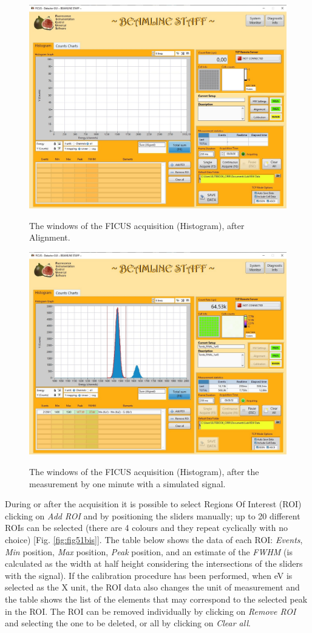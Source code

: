 \documentclass[a4paper,12pt,oneside,pdflatex,italian,final,twocolumn]{article}
\begin{document}
\begin{figure}[h!]
\centering
{\includegraphics[width=.85\textwidth]{Cattura90.jpg}} \quad
\caption{The windows of the FICUS acquisition (Histogram), after Alignment.}\label{fig:fig50}
\end{figure}

\begin{figure}[h!]
\centering
{\includegraphics[width=.85\textwidth]{Cattura98.jpg}} \quad
\caption{The windows of the FICUS acquisition (Histogram), after the measurement by one minute with a simulated signal.}\label{fig:fig51}
\end{figure}

\clearpage

During or after the acquisition it is possible to select Regions Of Interest (ROI) clicking on \textit{Add ROI} and by positioning the sliders manually; up to 20 different ROIs can be selected (there are 4 colours and they repeat cyclically with no choice) [Fig. \ref{fig:fig51bis}]. 
The table below shows the data of each ROI: \textit{Events}, \textit{Min} position, \textit{Max} position, \textit{Peak} position, and an estimate of the \textit{FWHM} (is calculated as the width at half height considering the intersections of the sliders with the signal). 
If the calibration procedure has been performed, when eV is selected as the X unit, the ROI data also changes the unit of measurement and the table shows the list of the elements that may correspond to the selected peak in the ROI.
The ROI can be removed individually by clicking on \textit{Remove ROI} and selecting the one to be deleted, or all by clicking on \textit{Clear all}.
\end{document}
